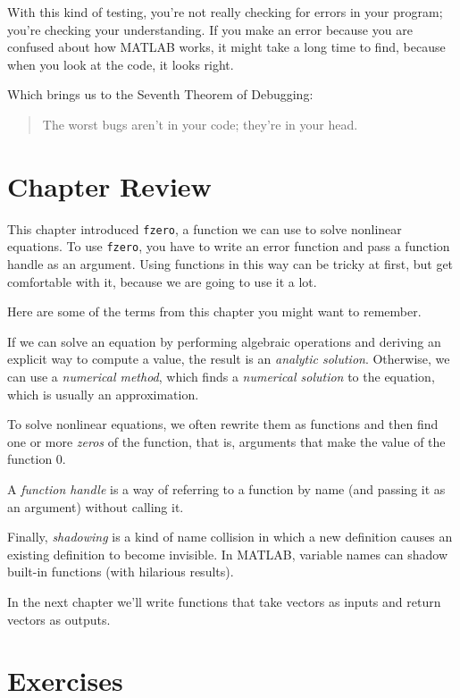 With this kind of testing, you're not really checking for
errors in your program; you're checking your understanding.  If you
make an error because you are confused about how MATLAB works, it
might take a long time to find, because when you look at the code,
it looks right.


Which brings us to the Seventh Theorem of Debugging:

\begin{quote}
The worst bugs aren't in your code; they're in your head.
\end{quote}

\section{Chapter Review}

This chapter introduced \lstinline{fzero}, a function we can use to solve nonlinear equations.
To use \lstinline{fzero}, you have to write an error function and pass a function handle as an argument.  Using functions in this way can be tricky at first, but get comfortable with it, because we are going to use it a lot.

Here are some of the terms from this chapter you might want to remember.

If we can solve an equation by performing algebraic operations and deriving an explicit way to compute a value, the result is an {\em analytic solution}.
Otherwise, we can use a {\em numerical method}, which finds a {\em numerical solution} to the equation, which is usually an approximation.

To solve nonlinear equations, we often rewrite them as functions and then find one or more {\em zeros} of the function, that is, arguments that make the value of the function $0$.

A {\em function handle} is a way of
referring to a function by name (and passing it as an argument)
without calling it.

Finally, {\em shadowing} is a kind of name collision in which a new definition
causes an existing definition to become invisible.  In MATLAB,
variable names can shadow built-in functions (with hilarious results).

In the next chapter we'll write functions that take vectors as inputs and return vectors as outputs.


\section{Exercises}

